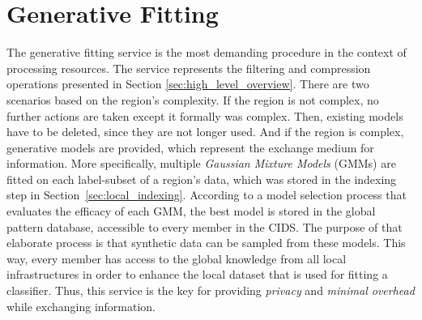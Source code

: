 \section{Generative Fitting} \label{sec:generative_fitting}

The generative fitting service is the most demanding procedure in the context of processing resources. The service represents the filtering and compression operations presented in Section \ref{sec:high_level_overview}. There are two scenarios based on the region's complexity. If the region is not complex, no further actions are taken except it formally was complex. Then, existing models have to be deleted, since they are not longer used. And if the region is complex, generative models are provided, which represent the exchange medium for information. More specifically, multiple \textit{Gaussian Mixture Models} (GMMs) are fitted on each label-subset of a region's data, which was stored in the indexing step in Section~\ref{sec:local_indexing}. According to a model selection process that evaluates the efficacy of each GMM, the best model is stored in the global pattern database, accessible to every member in the CIDS. The purpose of that elaborate process is that synthetic data can be sampled from these models. This way, every member has access to the global knowledge from all local infrastructures in order to enhance the local dataset that is used for fitting a classifier. Thus, this service is the key for providing \textit{privacy} and \textit{minimal overhead} while exchanging information.

